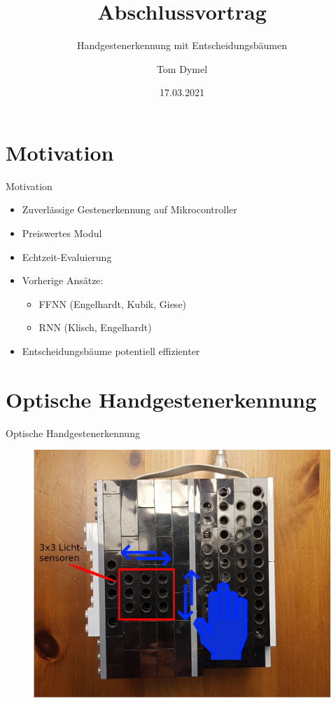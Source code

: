 \documentclass[10pt]{beamer}
\title{Abschlussvortrag}
\subtitle{Handgestenerkennung mit Entscheidungsbäumen}
\date{17.03.2021}
\author{Tom Dymel}
\institute{Forschungsprojekt und Seminar\\Technische Universität Hamburg}
\begin{document}
\maketitle

\section{Motivation}
\begin{frame}{Motivation}
\begin{itemize}
    \item Zuverlässige Gestenerkennung auf Mikrocontroller
    \item Preiswertes Modul
    \item Echtzeit-Evaluierung 
    \item Vorherige Ansätze:
    \begin{itemize}
        \item FFNN (Engelhardt, Kubik, Giese)
        \item RNN (Klisch, Engelhardt)
    \end{itemize}
    \item Entscheidungsbäume potentiell effizienter
\end{itemize}
\end{frame}

\section{Optische Handgestenerkennung}
\begin{frame}{Optische Handgestenerkennung}
\begin{figure}
    \includegraphics[width=0.9\linewidth]{aufgabe.png}
  \end{figure}
\end{frame}
\end{document}

